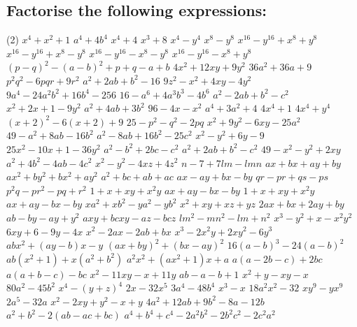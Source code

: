 	\subsection*{Factorise the following expressions:}
		\begin{tasks}[label = \arabic*.,label-width = 1.5em](2) %
			\task $x^4+x^2+1$
			\task $a^4+4b^4$
			\task $x^4+4$
			\task $x^3+8$
			\task $x^4-y^4$
			\task $x^8-y^8$
			\task $x^{16}-y^{16}+x^8+y^8$
			\task $x^{16}-y^{16}+x^8-y^8$
			\task $x^{16}-y^{16}-x^8-y^8$
			\task $x^{16}-y^{16}-x^8+y^8$
			\task $(p-q)^2-(a-b)^2+p+q-a+b$
			\task $4x^2+12xy+9y^2$
			\task $36a^2+36a+9$
			\task $p^2q^2-6pqr+9r^2$
			\task $a^2+2ab+b^2-16$
			\task $9z^2-x^2+4xy-4y^2$
			\task $9a^4-24a^2b^2+16b^4-256$
			\task $16-a^6+4a^3b^3-4b^6$
			\task $a^2-2ab+b^2-c^2$
			\task $x^2+2x+1-9y^2$
			\task $a^2+4ab+3b^2$
			\task $96-4x-x^2$
			\task $a^4+3a^2+4$
			\task $4x^4+1$
			\task $4x^4+y^4$
			\task $(x+2)^2-6(x+2)+9$
			\task $25-p^2-q^2-2pq$
			\task $x^2+9y^2-6xy-25a^2$
			\task $49-a^2+8ab-16b^2$
			\task $a^2-8ab+16b^2-25c^2$
			\task $x^2-y^2+6y-9$
			\task $25x^2-10x+1-36y^2$
			\task $a^2-b^2+2bc-c^2$
			\task $a^2+2ab+b^2-c^2$
			\task $49-x^2-y^2+2xy$
			\task $a^2+4b^2-4ab-4c^2$
			\task $x^2-y^2-4xz+4z^2$
			\task $n-7+7lm-lmn$
			\task $ax+bx+ay+by$
			\task $ax^2+by^2+bx^2+ay^2$
			\task $a^2+bc+ab+ac$
			\task $ax-ay+bx-by$
			\task $qr-pr+qs-ps$
			\task $p^2q-pr^2-pq+r^2$
			\task $1+x+xy+x^2y$
			\task $ax+ay-bx-by$
			\task $1+x+xy+x^2y$
			\task $ax+ay-bx-by$
			\task $xa^2+xb^2-ya^2-yb^2$
			\task $x^2+xy+xz+yz$
			\task $2ax+bx+2ay+by$
			\task $ab-by-ay+y^2$
			\task $axy+bcxy-az-bcz$
			\task $lm^2-mn^2-lm+n^2$
			\task $x^3-y^2+x-x^2y^2$
			\task $6xy+6-9y-4x$
			\task $x^2-2ax-2ab+bx$
			\task $x^3-2x^2y+2xy^2-6y^3$
			\task $abx^2+(ay-b)x-y$
			\task $(ax+by)^2+(bx-ay)^2$
			\task $16(a-b)^3-24(a-b)^2$
			\task $ab(x^2+1)+x(a^2+b^2)$
			\task $a^2x^2+(ax^2+1)x+a$
			\task $a(a-2b-c)+2bc$
			\task $a(a+b-c)-bc$
			\task $x^2-11xy-x+11y$
			\task $ab-a-b+1$
			\task $x^2+y-xy-x$
			\task $80a^2-45b^2$ 
			\task $x^4-(y+z)^4$
			\task $2x-32x^5$
			\task $3a^4-48b^4$
			\task $x^3-x$
			\task $18a^2x^2-32$
			\task $xy^9-yx^9$
			\task $2a^5-32a$
			\task $x^2-2xy+y^2-x+y$
			\task $4a^2+12ab+9b^2-8a-12b$
			\task $a^2+b^2-2(ab-ac+bc)$
			\task $a^4+b^4+c^4-2a^2b^2-2b^2c^2-2c^2a^2$
			
		\end{tasks}
